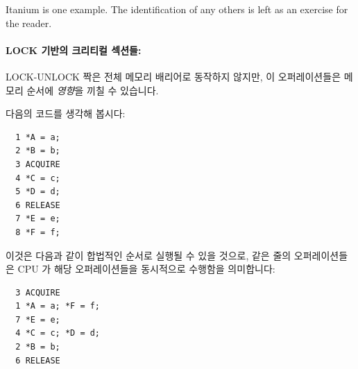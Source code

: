 \begin{enumerate}
{	Itanium is one example.
	The identification of any others is left as an
	exercise for the reader.
	\fi
} \QuickQuizEnd

\paragraph{LOCK 기반의 크리티컬 섹션들:}
LOCK-UNLOCK 짝은 전체 메모리 배리어로 동작하지 않지만, 이 오퍼레이션들은 메모리
순서에 \emph{영향}을 끼칠 수 있습니다.

다음의 코드를 생각해 봅시다:

\vspace{5pt}
\begin{minipage}[t]{\columnwidth}
\scriptsize
\begin{verbatim}
  1 *A = a;
  2 *B = b;
  3 ACQUIRE
  4 *C = c;
  5 *D = d;
  6 RELEASE
  7 *E = e;
  8 *F = f;
\end{verbatim}
\end{minipage}
\vspace{5pt}

이것은 다음과 같이 합법적인 순서로 실행될 수 있을 것으로, 같은 줄의
오퍼레이션들은 CPU 가 해당 오퍼레이션들을 동시적으로 수행함을 의미합니다:

\vspace{5pt}
\begin{minipage}[t]{\columnwidth}
\scriptsize
\begin{verbatim}
  3 ACQUIRE
  1 *A = a; *F = f;
  7 *E = e;
  4 *C = c; *D = d;
  2 *B = b;
  6 RELEASE
\end{verbatim}
\end{minipage}
\vspace{5pt}


\end{enumerate}
